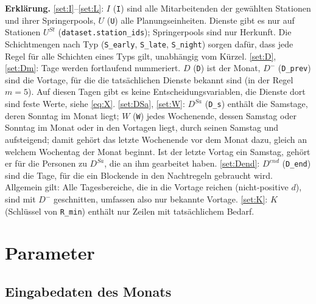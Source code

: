 \documentclass[11pt]{combiArticle}
\newcommand{\Dm}{D^{-}}
\newcommand{\code}[1]{\texttt{#1}}
\begin{document}
\textbf{Erklärung.}
\eqref{set:I}--\eqref{set:L}: $I$ (\code{I}) sind alle Mitarbeitenden der gewählten Stationen und ihrer
Springerpools, $U$ (\code{U}) alle Planungseinheiten. Dienste gibt es nur auf Stationen $U^{St}$
(\code{dataset.station\_ids}); Springerpools sind nur Herkunft. Die Schichtmengen nach Typ
(\code{S\_early}, \code{S\_late}, \code{S\_night}) sorgen dafür, dass jede Regel für alle Schichten eines
Typs gilt, unabhängig vom Kürzel.
\eqref{set:D}, \eqref{set:Dm}: Tage werden fortlaufend nummeriert. $D$ (\code{D}) ist der Monat, $\Dm$
(\code{D\_prev}) sind die Vortage, für die die tatsächlichen Dienste bekannt sind (in der Regel $m = 5$). Auf
diesen Tagen gibt es keine Entscheidungsvariablen, die Dienste dort sind feste Werte, siehe \eqref{eq:X}.
\eqref{set:DSa}, \eqref{set:W}: $D^{Sa}$ (\code{D\_s}) enthält die Samstage, deren Sonntag im Monat liegt;
$W$ (\code{W}) jedes Wochenende, dessen Samstag oder Sonntag im Monat oder in den Vortagen liegt, durch seinen
Samstag und aufsteigend; damit gehört das letzte Wochenende vor dem Monat dazu, gleich an welchem Wochentag der
Monat beginnt.
Ist der letzte Vortag ein Samstag, gehört er für die Personen zu $D^{Sa}$, die an ihm gearbeitet haben.
\eqref{set:Dend}: $D^{end}$ (\code{D\_end}) sind die Tage, für die ein Blockende in den Nachtregeln
gebraucht wird.
Allgemein gilt: Alle Tagesbereiche, die in die Vortage reichen (nicht-positive $d$), sind mit $\Dm$
geschnitten, umfassen also nur bekannte Vortage.
\eqref{set:K}: $K$ (Schlüssel von \code{R\_min}) enthält nur Zeilen mit tatsächlichem Bedarf.

\section{Parameter}

\subsection{Eingabedaten des Monats}
\end{document}
